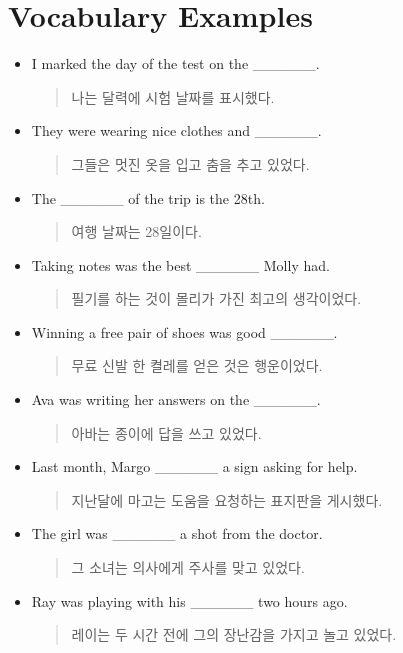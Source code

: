 \documentclass{article}
\begin{document}
\section*{Vocabulary Examples}
\begin{addmargin}[1em]{1em}
\begin{itemize}
    \item I marked the day of the test on the \_\_\_\_\_\_.
    \begin{quote}
    나는 달력에 시험 날짜를 표시했다.
    \end{quote}
    \item They were wearing nice clothes and \_\_\_\_\_\_.
    \begin{quote}
    그들은 멋진 옷을 입고 춤을 추고 있었다.
    \end{quote}
    \item The \_\_\_\_\_\_ of the trip is the 28th.
    \begin{quote}
    여행 날짜는 28일이다.
    \end{quote}
    \item Taking notes was the best \_\_\_\_\_\_ Molly had.
    \begin{quote}
    필기를 하는 것이 몰리가 가진 최고의 생각이었다.
    \end{quote}
    \item Winning a free pair of shoes was good \_\_\_\_\_\_.
    \begin{quote}
    무료 신발 한 켤레를 얻은 것은 행운이었다.
    \end{quote}
    \item Ava was writing her answers on the \_\_\_\_\_\_.
    \begin{quote}
    아바는 종이에 답을 쓰고 있었다.
    \end{quote}
    \item Last month, Margo \_\_\_\_\_\_ a sign asking for help.
    \begin{quote}
    지난달에 마고는 도움을 요청하는 표지판을 게시했다.
    \end{quote}
    \item The girl was \_\_\_\_\_\_ a shot from the doctor.
    \begin{quote}
    그 소녀는 의사에게 주사를 맞고 있었다.
    \end{quote}
    \item Ray was playing with his \_\_\_\_\_\_ two hours ago.
    \begin{quote}
    레이는 두 시간 전에 그의 장난감을 가지고 놀고 있었다.
    \end{quote}

\end{itemize}
\end{addmargin}
\end{document}
